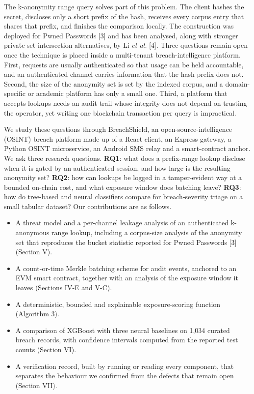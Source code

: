 \documentclass[10pt,twocolumn]{article}
\begin{document}
The k-anonymity range query solves part of this problem. The client hashes the secret, discloses only a short prefix of the hash, receives every corpus entry that shares that prefix, and finishes the comparison locally. The construction was deployed for Pwned Passwords [3] and has been analysed, along with stronger private-set-intersection alternatives, by Li \textit{et al.} [4]. Three questions remain open once the technique is placed inside a multi-tenant breach-intelligence platform. First, requests are usually authenticated so that usage can be held accountable, and an authenticated channel carries information that the hash prefix does not. Second, the size of the anonymity set is set by the indexed corpus, and a domain-specific or academic platform has only a small one. Third, a platform that accepts lookups needs an audit trail whose integrity does not depend on trusting the operator, yet writing one blockchain transaction per query is impractical.

We study these questions through BreachShield, an open-source-intelligence (OSINT) breach platform made up of a React client, an Express gateway, a Python OSINT microservice, an Android SMS relay and a smart-contract anchor. We ask three research questions. \textbf{RQ1}: what does a prefix-range lookup disclose when it is gated by an authenticated session, and how large is the resulting anonymity set? \textbf{RQ2}: how can lookups be logged in a tamper-evident way at a bounded on-chain cost, and what exposure window does batching leave? \textbf{RQ3}: how do tree-based and neural classifiers compare for breach-severity triage on a small tabular dataset? Our contributions are as follows.
\begin{itemize}
\item A threat model and a per-channel leakage analysis of an authenticated k-anonymous range lookup, including a corpus-size analysis of the anonymity set that reproduces the bucket statistic reported for Pwned Passwords [3] (Section V).
\item A count-or-time Merkle batching scheme for audit events, anchored to an EVM smart contract, together with an analysis of the exposure window it leaves (Sections IV-E and V-C).
\item A deterministic, bounded and explainable exposure-scoring function (Algorithm 3).
\item A comparison of XGBoost with three neural baselines on 1,034 curated breach records, with confidence intervals computed from the reported test counts (Section VI).
\item A verification record, built by running or reading every component, that separates the behaviour we confirmed from the defects that remain open (Section VII).
\end{itemize}
\end{document}
